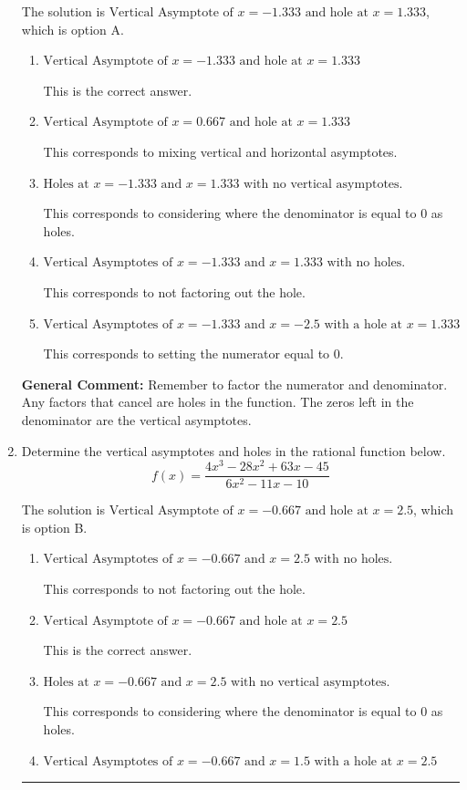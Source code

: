 \documentclass{extbook}[14pt]
\newcommand{\litem}[1]{\item #1

\rule{\textwidth}{0.4pt}}
\begin{document}
\begin{enumerate}
{The solution is \( \text{Vertical Asymptote of } x = -1.333 \text{ and hole at } x = 1.333 \), which is option A.\begin{enumerate}[label=\Alph*.]
\item \( \text{Vertical Asymptote of } x = -1.333 \text{ and hole at } x = 1.333 \)

This is the correct answer.
\item \( \text{Vertical Asymptote of } x = 0.667 \text{ and hole at } x = 1.333 \)

This corresponds to mixing vertical and horizontal asymptotes.
\item \( \text{Holes at } x = -1.333 \text{ and } x = 1.333 \text{ with no vertical asymptotes.} \)

This corresponds to considering where the denominator is equal to 0 as holes.
\item \( \text{Vertical Asymptotes of } x = -1.333 \text{ and } x = 1.333 \text{ with no holes.} \)

This corresponds to not factoring out the hole.
\item \( \text{Vertical Asymptotes of } x = -1.333 \text{ and } x = -2.5 \text{ with a hole at } x = 1.333 \)

This corresponds to setting the numerator equal to 0.
\end{enumerate}

\textbf{General Comment:} Remember to factor the numerator and denominator. Any factors that cancel are holes in the function. The zeros left in the denominator are the vertical asymptotes.
}
\litem{
Determine the vertical asymptotes and holes in the rational function below.
\[ f(x) = \frac{4x^{3} -28 x^{2} +63 x -45}{6x^{2} -11 x -10} \]

The solution is \( \text{Vertical Asymptote of } x = -0.667 \text{ and hole at } x = 2.5 \), which is option B.\begin{enumerate}[label=\Alph*.]
\item \( \text{Vertical Asymptotes of } x = -0.667 \text{ and } x = 2.5 \text{ with no holes.} \)

This corresponds to not factoring out the hole.
\item \( \text{Vertical Asymptote of } x = -0.667 \text{ and hole at } x = 2.5 \)

This is the correct answer.
\item \( \text{Holes at } x = -0.667 \text{ and } x = 2.5 \text{ with no vertical asymptotes.} \)

This corresponds to considering where the denominator is equal to 0 as holes.
\item \( \text{Vertical Asymptotes of } x = -0.667 \text{ and } x = 1.5 \text{ with a hole at } x = 2.5 \)


\end{enumerate}}
\end{enumerate}
\end{document}
